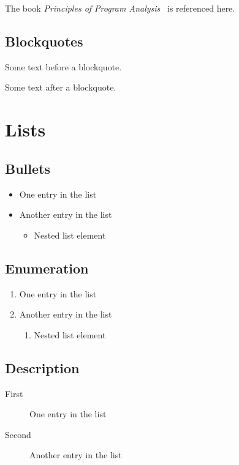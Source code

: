 The book \emph{Principles of Program Analysis}~\cite{Nielson:ppa} is referenced here.

\subsection{Blockquotes}

Some text before a blockquote.

\begin{quote}
	\lipsum[3]
\end{quote}

Some text after a blockquote.

\section{Lists}

\subsection{Bullets}

\begin{itemize}
	\item One entry in the list
	\item Another entry in the list
	      \begin{itemize}
		      \item Nested list element
	      \end{itemize}
\end{itemize}

\subsection{Enumeration}

\begin{enumerate}
	\item One entry in the list
	\item Another entry in the list
	      \begin{enumerate}
		      \item Nested list element
	      \end{enumerate}
\end{enumerate}

\subsection{Description}

\begin{description}
	\item[First] One entry in the list
	\item[Second] Another entry in the list
\end{description}

